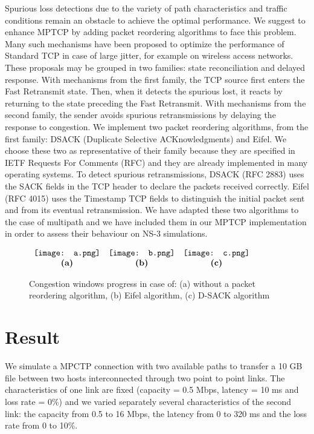 \documentclass[10pt,a4paper]{article}
\begin{document}
Spurious loss detections due to the variety of path characteristics and traffic conditions remain an obstacle to achieve the optimal performance. We suggest to enhance MPTCP by adding packet reordering algorithms to face this problem. Many such mechanisms have been proposed to optimize the performance of Standard TCP in case of large jitter, for example on wireless access networks. These proposals may be grouped in two families: state reconciliation and delayed response. With mechanisms from the first family, the TCP source first enters the Fast Retransmit state. Then, when it detects the spurious lost, it reacts by returning to the state preceding the Fast Retransmit. With mechanisms from the second family, the sender avoids spurious retransmissions by delaying the response to congestion. 
We implement two packet reordering algorithms, from the first family: DSACK (Duplicate Selective ACKnowledgments) and Eifel. We choose these two as representative of their family because they are specified in IETF Requests For Comments (RFC) and they are already implemented in many operating systems. To detect spurious retransmissions, DSACK (RFC 2883) uses the SACK fields in the TCP header to declare the packets received correctly. Eifel (RFC 4015) uses the Timestamp TCP fields to distinguish the initial packet sent and from its eventual retransmission. 
We have adapted these two algorithms to the case of multipath and we have included them in our MPTCP implementation in order to assess their behaviour on NS-3 simulations.

\begin{figure}[ht]
\begin{center}
$\begin{array}{ccc}
\texttt{[image: a.png]} 
& \texttt{[image: b.png]} 
& \texttt{[image: c.png]} \\
\mbox{\bf (a)} & \mbox{\bf (b)} & \mbox{\bf (c)} \\
\end{array}$
\caption{Congestion windows progress in case of: (a) without a packet reordering algorithm, (b) Eifel algorithm, (c) D-SACK algorithm}
\label{cwnd}
\end{center}
\end{figure}


\section{Result}
We simulate a MPCTP connection with two available paths to transfer a 10 GB file between two hosts interconnected through two point to point links. The characteristics of one link are fixed (capacity = 0.5 Mbps, latency = 10 ms and loss rate = 0\%) and we varied separately several characteristics of the second link: the capacity from 0.5 to 16 Mbps, the latency from 0 to 320 ms and the loss rate from 0 to 10\%. 
\end{document}

